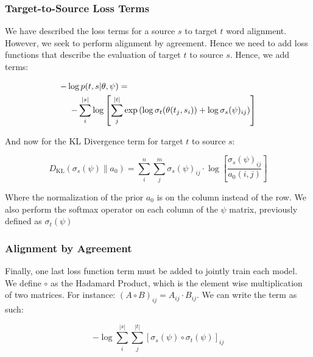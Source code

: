 \documentclass[twoside,twocolumn]{article}
\begin{document}
\subsubsection{Target-to-Source Loss Terms}

We have described the loss terms for a source $s$ to target $t$ word alignment.
However, we seek to perform alignment by agreement. Hence we need to add loss
functions that describe the evaluation of target $t$ to source $s$. Hence, we
add terms:

\begin{equation}
  \centering
  \begin{split}
  -\log  p(t & , s | \theta, \psi) = \\
  - \sum_i^{|s|} & \log \left[ \sum_j^{|t|}
      \exp \left(
        \log \sigma_t(\theta(t_j, s_i)) + \log \sigma_s(\psi)_{ij}
      \right)
    \right]
\end{split}
\end{equation}

And now for the KL Divergence term for target $t$ to source $s$:

\begin{equation}
D_{\mathrm{KL}} (\sigma_s(\psi) \| a_0) = \sum_i^n \sum_j^m \sigma_s(\psi)_{ij}
  \cdot \log \left[ \frac{\sigma_s(\psi)_{ij}}{a_0(i, j)} \right]
\end{equation}

Where the normalization of the prior $a_0$ is on the column instead of the row.
We also perform the softmax operator on each column of the $\psi$ matrix,
previously defined as $\sigma_t(\psi)$


\subsubsection{Alignment by Agreement}

Finally, one last loss function term must be added to jointly train each model.
We define $\circ$ as the Hadamard Product, which is the element wise
multiplication of two matrices. For instance:
$(A \circ B)_{ij} = A_{ij} \cdot B_{ij}$. We can write the term as such:

\begin{equation}
  -\log \sum_i^{|s|} \sum_j^{|t|}
    \left[ \sigma_s(\psi) \circ \sigma_t(\psi) \right]_{ij}
\end{equation}

\end{document}

